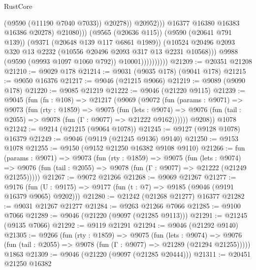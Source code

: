\begin{lexlean}{RustCore}
\begin{coremodule}
                                            (@9590 (@11190 @7040 @7033))
                                            @20278))
                                        @20952)))
                                  @16377
                                  @16380
                                  @16383
                                  @16386
                                  @20278)
                                @21080)))
                          (@9565 (@20636 @115))
                          (@9590 (@20641 @791 @139))
                          (@9371 (@20648 @139 @117 @6861 @1989))
                          (@10524
                            @20496
                            @2093
                            @320
                            @13
                            @2232
                            (@10556 @20496 @2093 @317 @13 @2231 @10568)))
                        @9988
                        (@9590 (@9993 @1097 @1060 @792))
                        @10001))))))))))
@21209 := @20351 @21208
@21210 := @9029 @178
@21214 := @9031 (@9035 @178) (@9041 @178)
@21215 := @9050 @16376
@21217 := @9046 (@21215 @9066)
@21219 := @9089 (@9090 @178)
@21220 := @9085 @21219
@21222 := @9046 (@21220 @9115)
@21239 := @9045
    (fun (fn : @108) =>
    @21217
      (@9069
        (@9072
          (fun (params : @9071) =>
          @9073
            (fun (rty : @1859) =>
            @9075
              (fun (lets : @9074) =>
              @9076 (fun (tail : @2055) => @9078 (fun (Γ : @9077) => @21222 @9162))))))
        @9208))
    @1078
@21242 := @9214 (@21215 (@9064 @1078))
@21245 := @9127 (@9128 @1078) @16379
@21249 := @9046 (@9119 (@21245 @9136) @9140)
@21250 := @9153 @1078
@21255 := @9150 (@9152 @21250 @16382 @9108 @9110)
@21266 := fun (params : @9071) =>
  @9073
    (fun (rty : @1859) =>
    @9075
      (fun (lets : @9074) =>
      @9076 (fun (tail : @2055) => @9078 (fun (Γ : @9077) => @21222 (@21249 @21255)))))
@21267 := @9072 @21266
@21268 := @9069 @21267
@21277 := @9176
    (fun (U : @9175) => @9177 (fun (t : @7) => @9185 (@9046 (@9191 @16379 @9065) @9202)))
@21280 := @21242 (@21268 @21277) @16377
@21282 := @9031 @21267 @21277
@21284 := @9263 @21266 @7066
@21285 := @9100 @7066
@21289 := @9046 (@21220 (@9097 (@21285 @9113)))
@21291 := @21245 (@9135 @7066)
@21292 := @9119 @21291
@21294 := @9046 (@21292 @9140)
@21305 := @9266
    (fun (rty : @1859) =>
    @9075
      (fun (lets : @9074) =>
      @9076 (fun (tail : @2055) => @9078 (fun (Γ : @9077) => @21289 (@21294 @21255)))))
    @1863
@21309 := @9046 (@21220 (@9097 (@21285 @20444)))
@21311 := @20451 @21250 @16382

\end{coremodule}
\end{lexlean}
